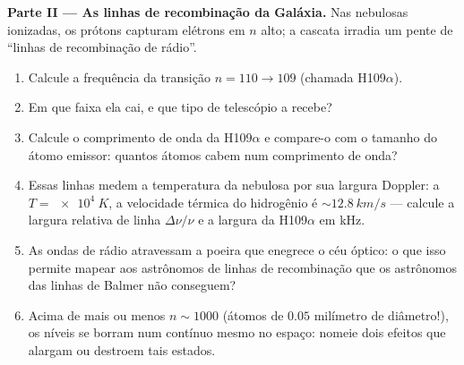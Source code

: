 \begin{problem}
\medskip\noindent\textbf{Parte II --- As linhas de recombinação da
Galáxia.}
Nas nebulosas ionizadas, os prótons capturam elétrons em $n$ alto; a
cascata irradia um pente de ``linhas de recombinação de rádio''.
\begin{enumerate}[resume]
  \item Calcule a frequência da transição $n = 110 \to 109$
        (chamada H109$\alpha$).
  \item Em que faixa ela cai, e que tipo de telescópio a recebe?
  \item Calcule o comprimento de onda da H109$\alpha$ e compare-o com
        o tamanho do átomo emissor: quantos átomos cabem num
        comprimento de onda?
  \item Essas linhas medem a temperatura da nebulosa por sua largura
        Doppler: a $T = \qty{e4}{K}$, a velocidade térmica do
        hidrogênio é $\sim\qty{12.8}{km/s}$ --- calcule a largura
        relativa de linha $\Delta\nu/\nu$ e a largura da H109$\alpha$
        em kHz.
  \item As ondas de rádio atravessam a poeira que enegrece o céu
        óptico: o que isso permite mapear aos astrônomos de linhas de
        recombinação que os astrônomos das linhas de Balmer não
        conseguem?
  \item Acima de mais ou menos $n \sim 1000$ (átomos de $0.05$
        milímetro de diâmetro!), os níveis se borram num contínuo mesmo
        no espaço: nomeie dois efeitos que alargam ou destroem tais
        estados.
\end{enumerate}


\end{problem}
